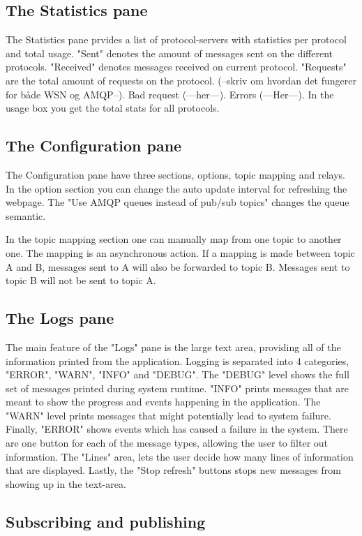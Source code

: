 \subsection{The Statistics pane}
The Statistics pane prvides a list of protocol-servers with statistics per protocol and total usage. "Sent" denotes the amount of messages sent on the different protocols. "Received" denotes messages received on current protocol. "Requests" are the total amount of requests on the protocol. (--skriv om hvordan det fungerer for både WSN og AMQP--). Bad request (---her---). Errors (---Her---). In the usage box you get the total stats for all protocols.

\subsection{The Configuration pane}
The Configuration pane have three sections, options, topic mapping and relays. In the option section you can change the auto update interval for refreshing the webpage. The "Use AMQP queues instead of pub/sub topics" changes the queue semantic.

In the topic mapping section one can manually map from one topic to another one. The mapping is an asynchronous action. If a mapping is made between topic A and B, messages sent to A will also be forwarded to topic B. Messages sent to topic B will not be sent to topic A.

\subsection{The Logs pane}

The main feature of the "Logs" pane is the large text area, providing all of the information printed from the application. Logging is separated into 4 categories, "ERROR", "WARN", "INFO" and "DEBUG". The "DEBUG" level shows the full set of messages printed during system runtime. "INFO" prints messages that are meant to show the progress and events happening in the application. The "WARN" level prints messages that might potentially lead to system failure. Finally, "ERROR" shows events which has caused a failure in the system. There are one button for each of the message types, allowing the user to filter out information. The "Lines" area, lets the user decide how many lines of information that are displayed. Lastly, the "Stop refresh" buttons stops new messages from showing up in the text-area.

\subsection{Subscribing and publishing}

